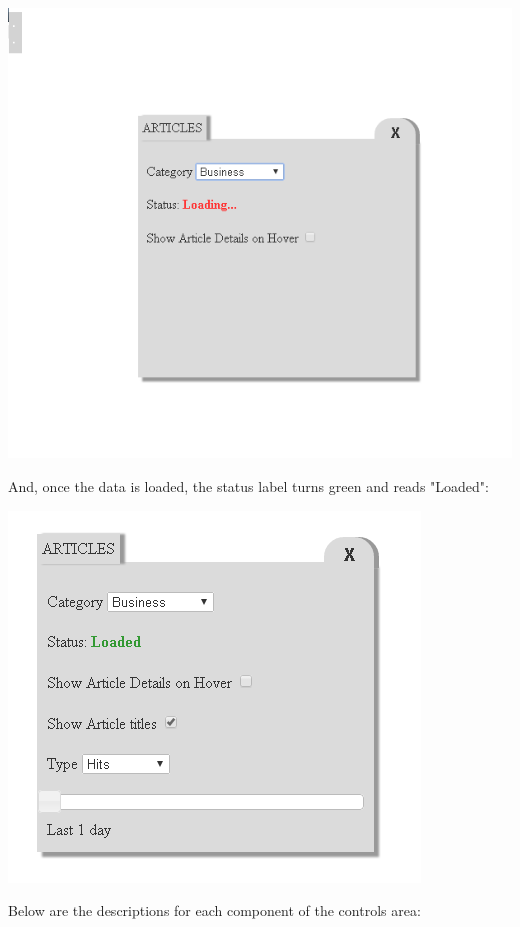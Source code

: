 \documentclass[12pt]{article}
\begin{document}
\noindent\includegraphics[scale=0.9]{img/viz_4}

And, once the data is loaded, the status label turns green and reads "Loaded":

\noindent\includegraphics[scale=0.9]{img/viz_5}

\noindent Below are the descriptions for each component of the controls area:
\end{document}
